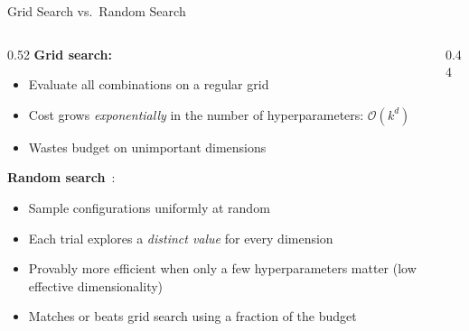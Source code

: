 \begin{frame}{Grid Search vs.\ Random Search}

  \begin{columns}[T]
    \begin{column}{0.52\textwidth}
      \textbf{Grid search:}
      \begin{itemize}
        \item Evaluate all combinations on a regular grid
        \item Cost grows \emph{exponentially} in the number of hyperparameters: $\mathcal{O}(k^d)$
        \item Wastes budget on unimportant dimensions
      \end{itemize}

      \vspace{0.4em}
      \textbf{Random search}~\cite{bergstra2012random}:
      \begin{itemize}
        \item Sample configurations uniformly at random
        \item Each trial explores a \emph{distinct value} for every dimension
        \item Provably more efficient when only a few hyperparameters matter (low effective dimensionality)
        \item Matches or beats grid search using a fraction of the budget
      \end{itemize}
    \end{column}
    \begin{column}{0.44\textwidth}
      \begin{center}
\end{center}
\end{column}
\end{columns}
\end{frame}

